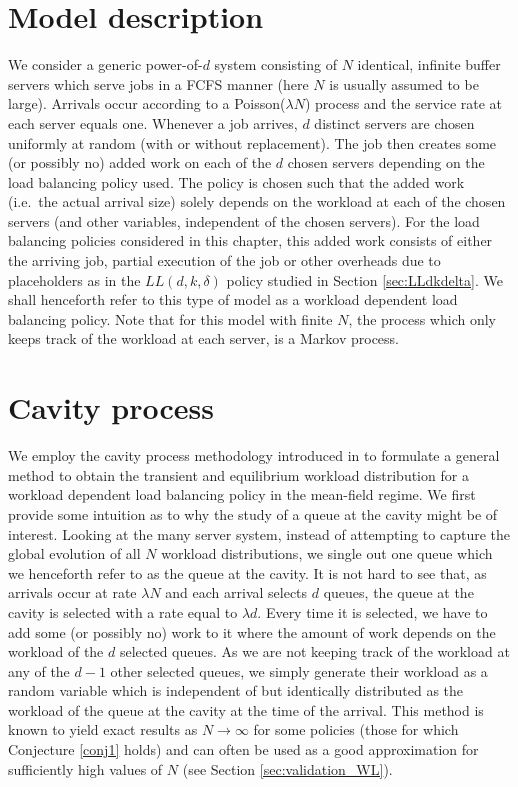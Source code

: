 \documentclass[12pt]{report}
\begin{document}
\section{Model description}\label{sec:model_description_WL}
We consider a generic power-of-$d$ system consisting of $N$ identical, infinite buffer servers which serve jobs in a FCFS manner (here $N$  is usually assumed to be large). Arrivals occur according to a Poisson($\lambda N$) process and the service rate at each server equals one. Whenever a job arrives, $d$ distinct servers are chosen uniformly at random (with or without replacement). The job then creates some (or possibly no) added work on each of the $d$ chosen servers depending on the load balancing policy used. The policy is chosen such that the added work (i.e.~the actual arrival size) solely depends on the workload at each of the chosen servers (and other variables, independent of the chosen servers). For the load balancing policies considered in this chapter, this added work consists of either the arriving job, partial execution of the job or other overheads due to placeholders as in the $LL(d,k,\delta)$ 
policy studied in Section \ref{sec:LLdkdelta}. We shall henceforth refer to this type of model as a workload dependent load balancing policy. Note that for this model with finite $N$, the process which only keeps track of the workload at each server, is a Markov process.

\section{Cavity process}\label{cavity_process}
We employ the cavity process methodology introduced in \cite{bramsonLB} to formulate a general method to obtain the transient and equilibrium workload distribution for a workload dependent load balancing policy in the mean-field regime. We first provide some intuition as to why the study of a queue at the cavity might be of interest. Looking at the many server system, instead of attempting to capture the global evolution of all $N$ workload distributions, we single out one queue which we henceforth refer to as the queue at the cavity. It is not hard to see that, as arrivals occur at rate $\lambda N$ and each arrival selects $d$ queues, the queue at the cavity is selected with a rate equal to $\lambda d$. Every time it is selected, we have to add some (or possibly no) work to it where the amount of work depends on the workload of the $d$ selected queues. As we are not keeping track of the workload at any of the $d-1$ other selected queues, we simply generate their workload as a random variable which is independent of but identically distributed as the workload of the queue at the cavity at the time of the arrival. This method is known to yield exact results as $N\rightarrow \infty$ for some policies (those for which Conjecture \ref{conj1} holds) and can often be used as a good approximation for sufficiently high values of $N$ (see Section \ref{sec:validation_WL}).
\end{document}
